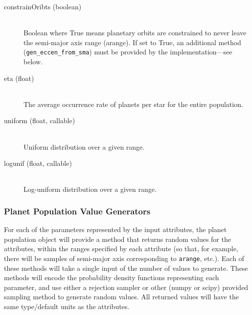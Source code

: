 \documentclass[cleanfoot]{asme2ej}
\begin{document}
\begin{itemize}
\begin{description}
    \item[constrainOribts (boolean)] \hfill \\ Boolean where True means planetary orbits are constrained to never leave the semi-major axis range (arange). If set to True, an additional method (\verb+gen_eccen_from_sma+) must be provided by the implementation---see below.
    \item[eta (float)] \hfill \\ The average occurrence rate of planets per star for the entire population.
    \item[uniform (float, callable)] \hfill \\ Uniform distribution over a given range.
    \item[logunif (float, callable)] \hfill \\ Log-uniform distribution over a given range.
\end{description}
\end{itemize}

\subsubsection{Planet Population Value Generators} \label{sec:pdfs}
For each of the parameters represented by the input attributes, the planet population object will provide a method that returns random values for the attributes, within the ranges specified by each attribute (so that, for example, there will be samples of semi-major axis corresponding to \verb+arange+, etc.).  Each of these methods will take a single input of the number of values to generate.  These methods will encode the probability density functions representing each parameter, and use either a rejection sampler or other (numpy or scipy) provided sampling method to generate random values.  All returned values will have the same type/default units as the attributes. 
\end{document}
